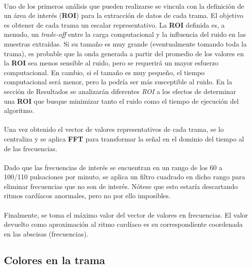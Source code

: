 \documentclass[12pt, twocolumn]{article}
\begin{document}
	\paragraph{} Uno de los primeros análisis que pueden realizarse se vincula con la definición de un área de interés (\textbf{ROI}) para la extracción de datos de cada trama. El objetivo es obtener de cada trama un escalar representativo.  La \textbf{ROI} definida es, a menudo,  un \textit{trade-off} entre la carga computacional y la influencia del ruido en las muestras extraídas. Si su tamaño es muy grande (eventualmente tomando toda la trama), es probable que la onda generada a partir del promedio de los valores en la \textbf{ROI} sea menos sensible al ruido, pero se requerirá un mayor esfuerzo computacional. En cambio, si el tamaño es muy pequeño, el tiempo computacional será menor, pero la podría ser más susceptible al ruido. En la sección de Resultados se analizarán diferentes \textit{ROI} a los efectos de determinar una \textbf{ROI} que busque minimizar tanto el ruido como el tiempo de ejecución del algoritmo.

	\paragraph{} Una vez obtenido el vector de valores representativos de cada trama, se lo centraliza y se aplica \textbf{FFT} para transformar la señal en el dominio del tiempo al de las frecuencias.
	
	\paragraph{} Dado que las frecuencias de interés se encuentran en un rango de los 60 a 100/110 pulsaciones por minuto, se aplica un filtro cuadrado en dicho rango para eliminar frecuencias que no son de interés. Nótese que esto estaría descartando ritmos cardíacos anormales, pero no por ello imposibles.
	
	\paragraph{} Finalmente, se toma el máximo valor del vector de valores en frecuencias. El valor devuelto como aproximación al ritmo cardíaco es su correspondiente coordenada en las abscisas (frecuencias).
	
	\subsection{Colores en la trama}  
	
\end{document}
